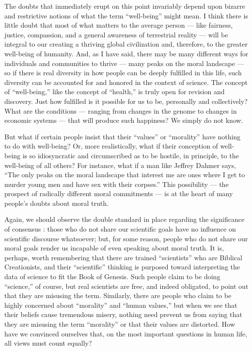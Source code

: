 \documentclass[a4paper,14pt]{extbook}
\begin{document}
The doubts that immediately erupt on this point invariably depend upon bizarre and restrictive notions of what the term ``well-being'' might mean.
I think there is little doubt that most of what matters to the average person --- like fairness, justice, compassion, and a general awareness of terrestrial reality --- will be integral to our creating a thriving global civilization and, therefore, to the greater well-being of humanity.
And, as I have said, there may be many different ways for individuals and communities to thrive --- many peaks on the moral landscape --- so if there is real diversity in how people can be deeply fulfilled in this life, such diversity can be accounted for and honored in the context of science.
The concept of ``well-being,'' like the concept of ``health,'' is truly open for revision and discovery.
Just how fulfilled is it possible for us to be, personally and collectively?
What are the conditions --- ranging from changes in the genome to changes in economic systems --- that will produce such happiness?
We simply do not know.

But what if certain people insist that their ``values'' or ``morality'' have nothing to do with well-being?
Or, more realistically, what if their conception of well-being is so idiosyncratic and circumscribed as to be hostile, in principle, to the well-being of all others?
For instance, what if a man like Jeffrey Dahmer says, ``The only peaks on the moral landscape that interest me are ones where I get to murder young men and have sex with their corpses.''
This possibility --- the prospect of radically different moral commitments --- is at the heart of many people's doubts about moral truth.

Again, we should observe the double standard in place regarding the significance of consensus :
those who do not share our scientific goals have no influence on scientific discourse whatsoever;
but, for some reason, people who do not share our moral goals render us incapable of even speaking about moral truth.
It is, perhaps, worth remembering that there are trained ``scientists'' who are Biblical Creationists, and their ``scientific'' thinking is purposed toward interpreting the data of science to fit the Book of Genesis.
Such people claim to be doing ``science,'' of course, but real scientists are free, and indeed obligated, to point out that they are misusing the term.
Similarly, there are people who claim to be highly concerned about ``morality'' and ``human values,'' but when we see that their beliefs cause tremendous misery, nothing need prevent us from saying that they are misusing the term ``morality'' or that their values are distorted.
How have we convinced ourselves that, on the most important questions in human life, all views must count equally?
\end{document}

